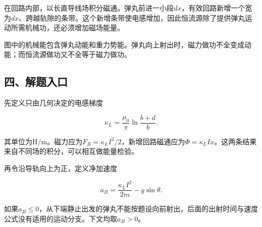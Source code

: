 \documentclass[12pt,a4paper,fontset=fandol]{ctexart}
\begin{document}
在回路内部，以长直导线场积分磁通。弹丸前进一小段\(dx\)，有效回路新增一个宽为\(dx\)、跨越轨隙的条带。这个新增条带使电感增加，因此恒流源除了提供弹丸运动所需机械功，还必须增加磁场能量。

\begin{center}
\begin{minipage}{\linewidth}
\centering\begingroup{}
\ifdim\wd\diagrambox>.88\linewidth
\sbox{\diagrambox}{\resizebox{.88\linewidth}{!}{\usebox{\diagrambox}}}\fi
\ifdim\ht\diagrambox>.38\textheight
\resizebox{!}{.38\textheight}{\usebox{\diagrambox}}
\else\usebox{\diagrambox}\fi
\par{}\endgroup\end{minipage}\end{center}

图中的机械能包含弹丸动能和重力势能。弹丸向上射出时，磁力做功不全变成动能；而恒流源做功又不全等于磁力做功。

\subsection{四、解题入口}\label{ux56dbux89e3ux9898ux5165ux53e3-2}

先定义只由几何决定的电感梯度

\[
\kappa_L=\frac{\mu_0}{\pi}\ln\frac{b+d}{b}.
\]

其单位为\(\mathrm{H/m}\)。磁力应为\(F_B=\kappa_LI^2/2\)，新增回路磁通应为\(\Phi=\kappa_LIx\)。这两条结果来自不同场的积分，可以相互做能量检验。

再令沿导轨向上为正，定义净加速度

\[
a_B=\frac{\kappa_LI^2}{2m}-g\sin\theta.
\]

如果\(a_B\le0\)，从下端静止出发的弹丸不能按题设向前射出，后面的出射时间与速度公式没有适用的运动分支。下文均取\(a_B>0\)。
\end{document}
